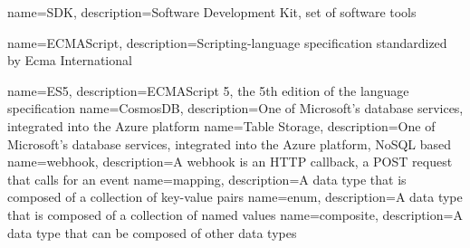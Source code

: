 {
	name=SDK,
	description={Software Development Kit, set of software tools}
}

{
	name=ECMAScript,
	description={Scripting-language specification standardized by Ecma International}
}

{
	name=ES5,
	description={ECMAScript 5, the 5th edition of the language specification}
}
{
	name=CosmosDB,
	description={One of Microsoft's database services, integrated into the Azure platform}
}
{
	name=Table Storage,
	description={One of Microsoft's database services, integrated into the Azure platform, NoSQL based}
}
{
	name=webhook,
	description={A webhook is an HTTP callback, a POST request that calls for an event}
}
{
	name=mapping,
	description={A data type that is composed of a collection of key-value pairs}
}
{
	name=enum,
	description={A data type that is composed of a collection of named values}
}
{
	name=composite,
	description={A data type that can be composed of other data types}
}